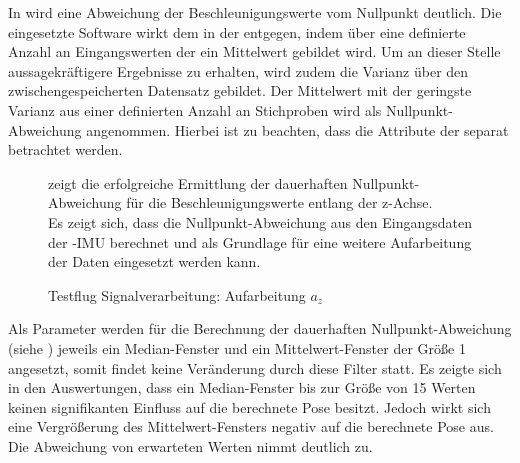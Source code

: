 

In  wird eine Abweichung der Beschleunigungswerte vom Nullpunkt deutlich. Die eingesetzte Software wirkt dem in der  entgegen, indem über eine definierte Anzahl an Eingangswerten der  ein Mittelwert gebildet wird. Um an dieser Stelle aussagekräftigere Ergebnisse zu erhalten, wird zudem die Varianz über den zwischengespeicherten Datensatz gebildet. Der Mittelwert mit der geringste Varianz aus einer definierten Anzahl an Stichproben wird als Nullpunkt-Abweichung angenommen. Hierbei ist zu beachten, dass die Attribute der  separat betrachtet werden.

\begin{figure}[ht!]
\vspace{0.25cm}
\begin{center}
\caption{Testflug Signalverarbeitung: Aufarbeitung $a_z$}
\label{fig:FlightStatusaz}
\end{center}

\vspace{0.25cm}
 zeigt die erfolgreiche Ermittlung der dauerhaften Nullpunkt-Abweichung für die Beschleunigungswerte entlang der z-Achse.\\
Es zeigt sich, dass die Nullpunkt-Abweichung aus den Eingangsdaten der \Quad-IMU berechnet und als Grundlage für eine weitere Aufarbeitung der Daten eingesetzt werden kann.
\end{figure}


Als Parameter werden für die Berechnung der dauerhaften Nullpunkt-Abweichung (siehe ) jeweils ein Median-Fenster und ein Mittelwert-Fenster der Größe 1 angesetzt, somit findet keine Veränderung durch diese Filter statt. Es zeigte sich in den Auswertungen, dass ein Median-Fenster bis zur Größe von 15 Werten keinen signifikanten Einfluss auf die berechnete Pose besitzt. Jedoch wirkt sich eine Vergrößerung des Mittelwert-Fensters negativ auf die berechnete Pose aus. Die Abweichung von erwarteten Werten nimmt deutlich zu.


